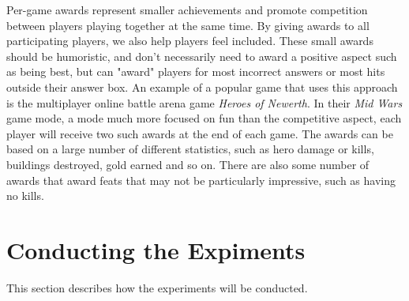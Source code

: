 Per-game awards represent smaller achievements and promote competition between players playing together at the same time. By giving awards to all participating players, we also help players feel included. These small awards should be humoristic, and don't necessarily need to award a positive aspect such as being best, but can "award" players for most incorrect answers or most hits outside their answer box. An example of a popular game that uses this approach is the multiplayer online battle arena game \emph{Heroes of Newerth}\citep{Newerth}. In their \emph{Mid Wars} game mode, a mode much more focused on fun than the competitive aspect, each player will receive two such awards at the end of each game. The awards can be based on a large number of different statistics, such as hero damage or kills, buildings destroyed, gold earned and so on\citep{MidWars}. There are also some number of awards that award feats that may not be particularly impressive, such as having no kills.


\section{Conducting the Expiments}

This section describes how the experiments will be conducted.